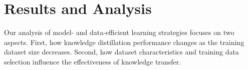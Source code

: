 \documentclass[conference]{IEEEtran}
\begin{document}

\section{Results and Analysis}

Our analysis of model- and data-efficient learning strategies focuses on two aspects.
First, how knowledge distillation performance changes as the training dataset size decreases.
Second, how dataset characteristics and training data selection influence the effectiveness of knowledge transfer.
\newcommand{\meanval}[1]{%
	{\fontsize{9}{9}\selectfont #1}%
}
\newcommand{\meanstd}[2]{%
	\mbox{%
		{\fontsize{9}{9}\selectfont #1}%
		\hspace{1pt}%
		{\fontsize{8}{8}\selectfont $\pm\,#2$}%
	}%
}
\end{document}

